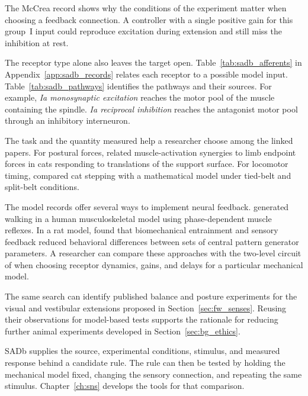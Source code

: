 The McCrea record shows why the conditions of the experiment matter when choosing a feedback connection. A controller with a single positive gain for this group~I input could reproduce excitation during extension and still miss the inhibition at rest.

The receptor type alone also leaves the target open. Table~\ref{tab:sadb_afferents} in Appendix~\ref{app:sadb_records} relates each receptor to a possible model input. Table~\ref{tab:sadb_pathways} identifies the pathways and their sources. For example, \emph{Ia monosynaptic excitation} reaches the motor pool of the muscle containing the spindle. \emph{Ia reciprocal inhibition} reaches the antagonist motor pool through an inhibitory interneuron.

The task and the quantity measured help a researcher choose among the linked papers. For postural forces, \citet{ting_limited_2005} related muscle-activation synergies to limb endpoint forces in cats responding to translations of the support surface. For locomotor timing, \citet{latash_organization_2020} compared cat stepping with a mathematical model under tied-belt and split-belt conditions.

The model records offer several ways to implement neural feedback. \citet{geyer_musclereflex_2010} generated walking in a human musculoskeletal model using phase-dependent muscle reflexes. In a rat model, \citet{deng_biomechanical_2022} found that biomechanical entrainment and sensory feedback reduced behavioral differences between sets of central pattern generator parameters. A researcher can compare these approaches with the two-level circuit of \citet{rybak_modelling_2006} when choosing receptor dynamics, gains, and delays for a particular mechanical model.

The same search can identify published balance and posture experiments for the visual and vestibular extensions proposed in Section~\ref{sec:fw_senses}. Reusing their observations for model-based tests supports the rationale for reducing further animal experiments developed in Section~\ref{sec:bg_ethics}.

SADb supplies the source, experimental conditions, stimulus, and measured response behind a candidate rule. The rule can then be tested by holding the mechanical model fixed, changing the sensory connection, and repeating the same stimulus. Chapter~\ref{ch:sns} develops the tools for that comparison.
